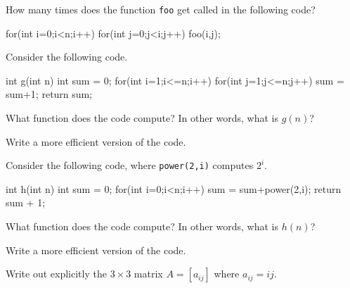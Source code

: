 \begin{pro}
How many times does the function \verb+foo+ get called in the following code?
\begin{code}
     for(int i=0;i<n;i++) {
         for(int j=0;j<i;j++) {
             foo(i,j);
         }
      }
\end{code}
\end{pro}

\begin{pro}
Consider the following code.
\begin{code}
    int g(int n) {
        int sum = 0;
        for(int i=1;i<=n;i++) {
            for(int j=1;j<=n;j++) {
                sum = sum+1;
            }
         }
         return sum;
    }
\end{code}
\begin{lenum}
\item What function does the code compute? In other words, what is $g(n)$?
\item Write a more efficient version of the code.
\end{lenum}
\end{pro}

\begin{pro}
Consider the following code, where \verb+power(2,i)+ computes $2^i$.
\begin{code}
    int h(int n) {
        int sum = 0;
        for(int i=0;i<n;i++) {
            sum = sum+power(2,i);
         }
         return sum + 1;
    }
\end{code}
\begin{lenum}
\item What function does the code compute? In other words, what is $h(n)$?
\item Write a more efficient version of the code.
\end{lenum}
\end{pro}



\begin{pro}
Write out explicitly the $3\times 3$ matrix $A = [a_{ij}]$ where
$a_{ij} = ij$.
\end{pro}


